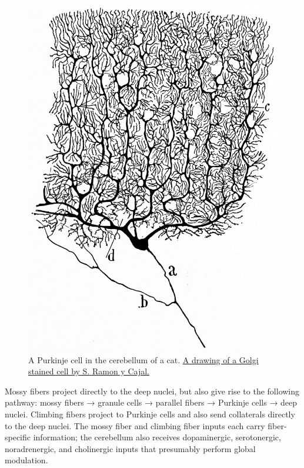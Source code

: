 \begin{figure}

{\centering \includegraphics[width=0.7\linewidth]{./figures/cns/purkinje_cell} 

}

\caption{A Purkinje cell in the cerebellum of a cat. \href{https://commons.wikimedia.org/wiki/File:Purkinje_cell_by_Cajal.png}{A drawing of a Golgi stained cell by S. Ramon y Cajal.}}\label{fig:purkinjecell}
\end{figure}

Mossy fibers project directly to the deep nuclei, but also give rise to the following pathway: mossy fibers → granule cells → parallel fibers → Purkinje cells → deep nuclei. Climbing fibers project to Purkinje cells and also send collaterals directly to the deep nuclei. The mossy fiber and climbing fiber inputs each carry fiber-specific information; the cerebellum also receives dopaminergic, serotonergic, noradrenergic, and cholinergic inputs that presumably perform global modulation.



